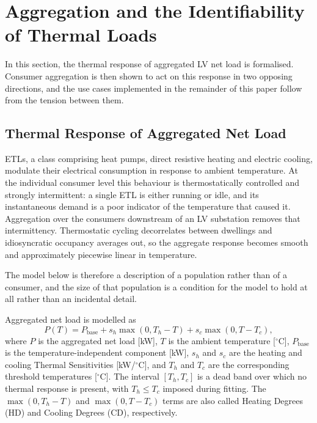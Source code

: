\documentclass[9pt,journal,a4]{IEEEtran}
\begin{document}
\begin{itemize}
\end{itemize}

\section{Aggregation and the Identifiability of Thermal Loads}
\label{section:identify}

In this section, the thermal response of aggregated LV net load is formalised. Consumer aggregation is then shown to act on this response in two opposing directions, and the use cases implemented in the remainder of this paper follow from the tension between them.


\subsection{Thermal Response of Aggregated Net Load}

ETLs, a class comprising heat pumps, direct resistive heating and electric cooling, modulate their electrical consumption in response to ambient temperature. At the individual consumer level this behaviour is thermostatically controlled and strongly intermittent: a single ETL is either running or idle, and its instantaneous demand is a poor indicator of the temperature that caused it. Aggregation over the consumers downstream of an LV substation removes that intermittency. Thermostatic cycling decorrelates between dwellings and idiosyncratic occupancy averages out, so the aggregate response becomes smooth and approximately piecewise linear in temperature.

The model below is therefore a description of a population rather than of a consumer, and the size of that population is a condition for the model to hold at all rather than an incidental detail.

Aggregated net load is modelled as
\begin{equation}
P(T)
=
P_{\mathrm{base}}
+
s_h \max\left(0,T_h-T\right)
+
s_c \max\left(0,T-T_c\right),
\label{eq:thermal-response}
\end{equation}
where $P$ is the aggregated net load [kW], $T$ is the ambient temperature [$^\circ$C], $P_{\mathrm{base}}$ is the temperature-independent component [kW], $s_h$ and $s_c$ are the heating and cooling Thermal Sensitivities [kW/$^\circ$C], and $T_h$ and $T_c$ are the corresponding threshold temperatures [$^\circ$C]. The interval $[T_h,T_c]$ is a dead band over which no thermal response is present, with $T_h \leq T_c$ imposed during fitting. The $\max\left(0,T_h-T\right)$ and $\max\left(0,T-T_c\right)$ terms are also called Heating Degrees (HD) and Cooling Degrees (CD), respectively.
\end{document}

